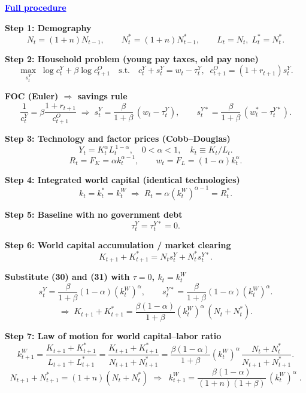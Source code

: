 \documentclass[12pt]{article}
\begin{document}
\textcolor{blue}{\textbf{\uline{Full procedure}}}

{\color{blue}
\textbf{Step 1: Demography}
\[
N_t=(1+n)N_{t-1},\qquad N_t^*=(1+n)N_{t-1}^*,\qquad L_t=N_t,\; L_t^*=N_t^*.
\]

\textbf{Step 2: Household problem (young pay taxes, old pay none)}
\[
\max_{s_t^Y}\;\log c_t^Y+\beta\log c_{t+1}^O
\quad\text{s.t.}\quad
c_t^Y+s_t^Y=w_t-\tau_t^Y,\;\; c_{t+1}^O=(1+r_{t+1})s_t^Y.
\]

\textbf{FOC (Euler) $\Rightarrow$ savings rule}
\[
\frac{1}{c_t^Y}=\beta\frac{1+r_{t+1}}{c_{t+1}^O}
\;\Rightarrow\;
s_t^Y=\frac{\beta}{1+\beta}\,(w_t-\tau_t^Y),\qquad
s_t^{Y*}=\frac{\beta}{1+\beta}\,(w_t^*-\tau_t^{Y*}). \tag{30}
\]

\textbf{Step 3: Technology and factor prices (Cobb–Douglas)}
\[
Y_t=K_t^{\alpha}L_t^{\,1-\alpha},\quad 0<\alpha<1,\quad k_t\equiv K_t/L_t.
\]
\[
R_t=F_K=\alpha k_t^{\alpha-1},\qquad 
w_t=F_L=(1-\alpha)k_t^{\alpha}. \tag{31}
\]

\textbf{Step 4: Integrated world capital (identical technologies)}
\[
k_t=k_t^*=k_t^W \;\Rightarrow\; 
R_t=\alpha(k_t^W)^{\alpha-1}=R_t^*. \tag{32}
\]

\textbf{Step 5: Baseline with no government debt}
\[
\tau_t^Y=\tau_t^{Y*}=0.
\]

\textbf{Step 6: World capital accumulation / market clearing}
\[
K_{t+1}+K_{t+1}^* = N_t s_t^Y + N_t^* s_t^{Y*}. \tag{33}
\]

\textbf{Substitute (30) and (31) with $\tau=0$, $k_t=k_t^W$}
\[
s_t^Y=\frac{\beta}{1+\beta}(1-\alpha)(k_t^W)^{\alpha},\qquad
s_t^{Y*}=\frac{\beta}{1+\beta}(1-\alpha)(k_t^W)^{\alpha}.
\]
\[
\Rightarrow\;
K_{t+1}+K_{t+1}^*
=\frac{\beta(1-\alpha)}{1+\beta}(k_t^W)^{\alpha}\,(N_t+N_t^*).
\]

\textbf{Step 7: Law of motion for world capital–labor ratio}
\[
k_{t+1}^W
=\frac{K_{t+1}+K_{t+1}^*}{L_{t+1}+L_{t+1}^*}
=\frac{K_{t+1}+K_{t+1}^*}{N_{t+1}+N_{t+1}^*}
=\frac{\beta(1-\alpha)}{1+\beta}(k_t^W)^{\alpha}\,
\frac{N_t+N_t^*}{N_{t+1}+N_{t+1}^*}.
\]
\[
N_{t+1}+N_{t+1}^*=(1+n)(N_t+N_t^*) \;\Rightarrow\;
\boxed{\;k_{t+1}^W=\frac{\beta(1-\alpha)}{(1+n)(1+\beta)}\,(k_t^W)^{\alpha}\;}. \tag{34}
\]
}
\end{document}
